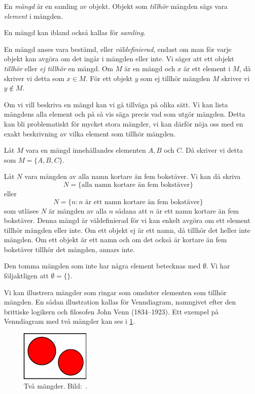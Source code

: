 \begin{definition}\label{CantorMangd}
  En \emph{mängd} är en samling av objekt.
  Objekt som \emph{tillhör} mängden sägs vara \emph{element} i mängden.
\end{definition}
En mängd kan ibland också kallas för \emph{samling}.

En mängd anses vara bestämd, eller \emph{väldefinierad}, endast om man för
varje objekt kan avgöra om det ingår i mängden eller inte.
Vi säger att ett objekt \emph{tillhör} eller \emph{ej tillhör} en mängd.
Om \(M\) är en mängd och \(x\) är ett element i \(M\), då skriver vi detta som
\(x\in M\).
För ett objekt \(y\) som ej tillhör mängden \(M\) skriver vi \(y\notin M\).

Om vi vill beskriva en mängd kan vi gå tillväga på olika sätt.
Vi kan lista mängdens alla element och på så vis säga precis vad som utgör
mängden.
Detta kan bli problematiskt för mycket stora mängder, vi kan därför nöja oss
med en exakt beskrivning av vilka element som tillhör mängden.
\begin{example}\label{ExEnkelMangd}
  Låt \(M\) vara en mängd innehållandes elementen \(A,B\) och \(C\).
  Då skriver vi detta som \(M=\{A,B,C\}\).
\end{example}
\begin{example}
  Låt \(N\) vara mängden av alla namn kortare än fem bokstäver.
  Vi kan då skriva \[N=\{\text{alla namn kortare än fem bokstäver}\}\] eller
  \[N=\{n\colon n\text{ är ett namn kortare än fem bokstäver}\}\] som utläses
  \(N\) är mängden av alla \(n\) sådana att \(n\) är ett namn kortare än fem
  bokstäver.
  Denna mängd är väldefinierad för vi kan enkelt avgöra om ett element
  tillhör mängden eller inte.
  Om ett objekt ej är ett namn, då tillhör det heller inte mängden.
  Om ett objekt är ett namn och om det också är kortare än fem bokstäver
  tillhör det mängden, annars inte.
\end{example}
\begin{example}\label{ExTommaMangden}
  Den tomma mängden som inte har några element betecknas med \(\emptyset\).
  Vi har följaktligen att \(\emptyset=\{\}\).
\end{example}

Vi kan illustrera mängder som ringar som omsluter elementen som tillhör
mängden.
En sådan illustration kallas för Venndiagram, namngivet efter den brittiske 
logikern och filosofen John Venn (1834--1923).
Ett exempel på Venndiagram med två mängder kan ses i \cref{fig:Disjunkt}.
\begin{figure}
  \includegraphics[width=0.3\textwidth]{figs/disjoint.pdf}
  \caption{%
    Två mängder.
    Bild:~\cite{Wikipedia2013Set}.
  }\label{fig:Disjunkt}
\end{figure}

